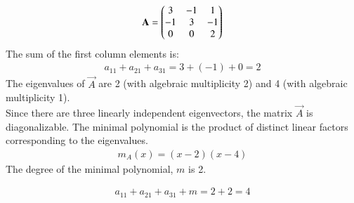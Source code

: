 \documentclass[journal]{IEEEtran}
\begin{document}
\begin{align}
\mathbf{A} = \begin{pmatrix}
3 & -1 & 1 \\
-1 & 3 & -1 \\
0 & 0 & 2
\end{pmatrix}
\end{align}
The sum of the first column elements is:
\begin{align}
a_{11} + a_{21} + a_{31} = 3 + (-1) + 0 = 2
\end{align}
The eigenvalues of $\vec{A}$ are 2 (with algebraic multiplicity 2) and 4 (with algebraic multiplicity 1).\\
Since there are three linearly independent eigenvectors, the matrix $\vec{A}$ is diagonalizable. The minimal polynomial is the product of distinct linear factors corresponding to the eigenvalues.
\begin{align}
m_A(x) = (x-2)(x-4)
\end{align}
The degree of the minimal polynomial, $m$ is 2.

\begin{align}
a_{11} + a_{21} + a_{31} + m = 2 + 2 = 4
\end{align}
\end{document}
